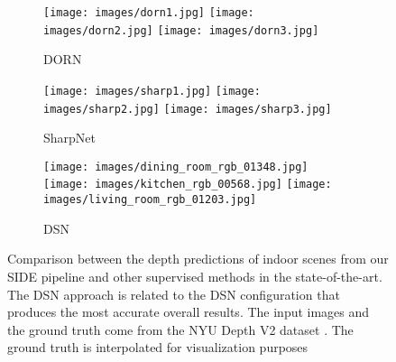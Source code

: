 \documentclass[5p]{elsarticle}
\begin{document}
\begin{figure*}[t!]
\begin{subfigure}[t]{0.16\textwidth}
         \centering
         \caption{DORN \cite{fu2018deep}}
         \texttt{[image: images/dorn1.jpg]}
         \hspace{1em}
         \texttt{[image: images/dorn2.jpg]}
         \hspace{1em}
         \texttt{[image: images/dorn3.jpg]}
         \label{subfig1:dorn}
     \end{subfigure}
         \begin{subfigure}[t]{0.16\textwidth}
         \centering
         \caption{SharpNet \cite{ramamonjisoa2019sharpnet}}
         \texttt{[image: images/sharp1.jpg]}
         \hspace{1em}
         \texttt{[image: images/sharp2.jpg]}
         \hspace{1em} 
         \texttt{[image: images/sharp3.jpg]}
         \label{subfig1:sharpnet}
     \end{subfigure}
     \begin{subfigure}[t]{0.16\textwidth}
         \centering
         \caption{DSN}
         \texttt{[image: images/dining\_room\_rgb\_01348.jpg]}
         \hspace{1em}
         \texttt{[image: images/kitchen\_rgb\_00568.jpg]}
         \hspace{1em}
         \texttt{[image: images/living\_room\_rgb\_01203.jpg]}
         \label{subfig1:DSN}
     \end{subfigure}
     \caption{Comparison between the depth predictions of indoor scenes from our SIDE pipeline and other supervised methods in the state-of-the-art. The DSN approach is related to the DSN configuration that produces the most accurate overall results. The input images and the ground truth come from the NYU Depth V2 dataset \cite{silberman2012indoor}. The ground truth is interpolated for visualization purposes}
     \label{subfig1NYU:all}
\end{figure*}
\end{document}
